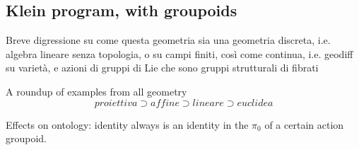 \subsection{Klein program, with groupoids}
\begin{remark}
Breve digressione su come questa geometria sia una geometria discreta, i.e. algebra lineare senza topologia, o su campi finiti, così come continua, i.e. geodiff su varietà, e azioni di gruppi di Lie che sono gruppi strutturali di fibrati
\end{remark}
\begin{example}
  A roundup of examples from all geometry
\[proiettiva \supset affine \supset lineare \supset euclidea\]
\end{example}
Effects on ontology: identity always is an identity in the $\pi_0$ of a certain action groupoid.
